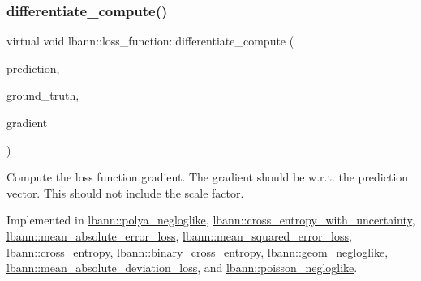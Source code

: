 \subsubsection{\texorpdfstring{differentiate\+\_\+compute()}{differentiate\_compute()}}
{\footnotesize\ttfamily virtual void lbann\+::loss\+\_\+function\+::differentiate\+\_\+compute (\begin{DoxyParamCaption}\item[{const \hyperlink{base_8hpp_a9a697a504ae84010e7439ffec862b470}{Abs\+Dist\+Mat} \&}]{prediction,  }\item[{const \hyperlink{base_8hpp_a9a697a504ae84010e7439ffec862b470}{Abs\+Dist\+Mat} \&}]{ground\+\_\+truth,  }\item[{\hyperlink{base_8hpp_a9a697a504ae84010e7439ffec862b470}{Abs\+Dist\+Mat} \&}]{gradient }\end{DoxyParamCaption})\hspace{0.3cm}{\ttfamily [pure virtual]}}

Compute the loss function gradient. The gradient should be w.\+r.\+t. the prediction vector. This should not include the scale factor. 

Implemented in \hyperlink{classlbann_1_1polya__negloglike_a95fea60663d86cab31d89531046cc32c}{lbann\+::polya\+\_\+negloglike}, \hyperlink{classlbann_1_1cross__entropy__with__uncertainty_a48ebe2b7a2193c124df0cd15813835d0}{lbann\+::cross\+\_\+entropy\+\_\+with\+\_\+uncertainty}, \hyperlink{classlbann_1_1mean__absolute__error__loss_af1d8c8bacc959273f9f54eafbe5c1f7d}{lbann\+::mean\+\_\+absolute\+\_\+error\+\_\+loss}, \hyperlink{classlbann_1_1mean__squared__error__loss_aef698469d2e70a5d42e402eeca50efa3}{lbann\+::mean\+\_\+squared\+\_\+error\+\_\+loss}, \hyperlink{classlbann_1_1cross__entropy_a5a91b6dac7d27980c47f6fd818963d1b}{lbann\+::cross\+\_\+entropy}, \hyperlink{classlbann_1_1binary__cross__entropy_aeb1d10100a565e1c92a4f75fb7f58829}{lbann\+::binary\+\_\+cross\+\_\+entropy}, \hyperlink{classlbann_1_1geom__negloglike_ac87d97a78cc3bb00f976bcd604fc72d7}{lbann\+::geom\+\_\+negloglike}, \hyperlink{classlbann_1_1mean__absolute__deviation__loss_a3ed0cbe4e405c10bf3f6a80eb693390e}{lbann\+::mean\+\_\+absolute\+\_\+deviation\+\_\+loss}, and \hyperlink{classlbann_1_1poisson__negloglike_a9b6e6632bb6424551b38b8748ff64edd}{lbann\+::poisson\+\_\+negloglike}.


